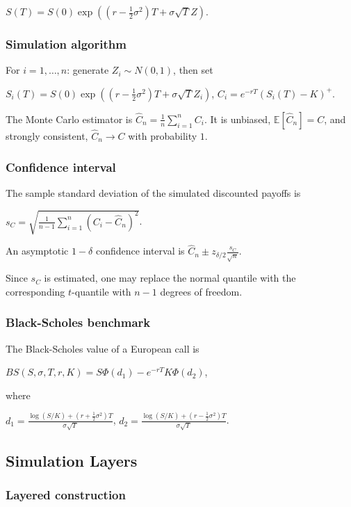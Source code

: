 $S(T)=S(0)\exp\left((r-\frac{1}{2}\sigma^2)T+\sigma\sqrt{T}Z\right)$.

\subsubsection*{Simulation algorithm}

For $i=1,\ldots,n$: generate $Z_i\sim N(0,1)$, then set

$S_i(T)=S(0)\exp\left((r-\frac{1}{2}\sigma^2)T+\sigma\sqrt{T}Z_i\right)$,
$C_i=e^{-rT}(S_i(T)-K)^+$.

The Monte Carlo estimator is $\hat{C}_n=\frac{1}{n}\sum_{i=1}^n C_i$. It is unbiased, $\mathbb{E}[\hat{C}_n]=C$, and strongly consistent, $\hat{C}_n\to C$ with probability $1$.

\subsubsection*{Confidence interval}

The sample standard deviation of the simulated discounted payoffs is

$s_C=\sqrt{\frac{1}{n-1}\sum_{i=1}^n(C_i-\hat{C}_n)^2}$.

An asymptotic $1-\delta$ confidence interval is
$\hat{C}_n\pm z_{\delta/2}\frac{s_C}{\sqrt{n}}$.

Since $s_C$ is estimated, one may replace the normal quantile with the corresponding $t$-quantile with $n-1$ degrees of freedom.

\subsubsection*{Black-Scholes benchmark}

The Black-Scholes value of a European call is

$BS(S,\sigma,T,r,K)=S\Phi(d_1)-e^{-rT}K\Phi(d_2)$,

where

$d_1=\frac{\log(S/K)+(r+\frac{1}{2}\sigma^2)T}{\sigma\sqrt{T}}$,
$d_2=\frac{\log(S/K)+(r-\frac{1}{2}\sigma^2)T}{\sigma\sqrt{T}}$.

\subsection{Simulation Layers}

\subsubsection*{Layered construction}

